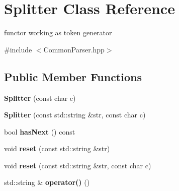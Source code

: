 \hypertarget{classSplitter}{
\section{Splitter Class Reference}
\label{classSplitter}
}


functor working as token generator  




{\ttfamily \#include $<$CommonParser.hpp$>$}

\subsection*{Public Member Functions}
\begin{DoxyCompactItemize}
\item 
\hypertarget{classSplitter_ae9be005ba89c93690575bdb7826fc340}{
{\bfseries Splitter} (const char c)}
\label{classSplitter_ae9be005ba89c93690575bdb7826fc340}

\item 
\hypertarget{classSplitter_ac86cd0ccc07d70cd79b1ed6b75fceb38}{
{\bfseries Splitter} (const std::string \&str, const char c)}
\label{classSplitter_ac86cd0ccc07d70cd79b1ed6b75fceb38}

\item 
\hypertarget{classSplitter_a6f65c75ceb97d11a55c8dcb9b7d9ce83}{
bool {\bfseries hasNext} () const }
\label{classSplitter_a6f65c75ceb97d11a55c8dcb9b7d9ce83}

\item 
\hypertarget{classSplitter_a78f226f811f328aba0693e74f93a96a0}{
void {\bfseries reset} (const std::string \&str)}
\label{classSplitter_a78f226f811f328aba0693e74f93a96a0}

\item 
\hypertarget{classSplitter_adf885b01df3fdb06f5cb989fa024fae7}{
void {\bfseries reset} (const std::string \&str, const char c)}
\label{classSplitter_adf885b01df3fdb06f5cb989fa024fae7}

\item 
\hypertarget{classSplitter_a2d05ab558b5ded29ec81650ca6f732dc}{
std::string \& {\bfseries operator()} ()}
\label{classSplitter_a2d05ab558b5ded29ec81650ca6f732dc}

\end{DoxyCompactItemize}
